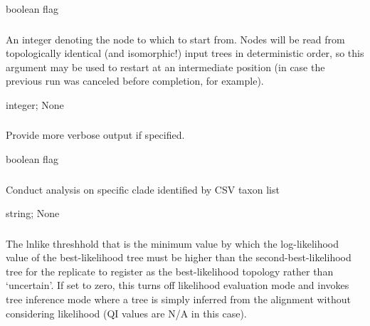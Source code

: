 \documentclass[letterpaper,12pt,english]{sphinxmanual}
\begin{document}
 boolean flag


\subsubsection{}
\label{\detokenize{prog_desc:s-start-node-number}}
 An integer denoting the node to which to start from. Nodes will be read from topologically identical (and isomorphic!) input trees in deterministic order, so this argument may be  used to restart at an intermediate position (in case the previous run was canceled before completion, for example).

 integer;  None


\subsubsection{}
\label{\detokenize{prog_desc:v-verbose}}
 Provide more verbose output if specified.

 boolean flag


\subsubsection{}
\label{\detokenize{prog_desc:c-clade}}
 Conduct analysis on specific clade identified by CSV taxon list

 string;  None


\subsubsection{}
\label{\detokenize{prog_desc:l-lnlike-thresh}}
 The lnlike threshhold that is the minimum value by which the log-likelihood value of the best-likelihood tree must be higher than the second-best-likelihood tree for the replicate to register as the best-likelihood topology rather than ‘uncertain’. If set to zero, this turns off likelihood evaluation mode and invokes tree inference mode where a tree is simply inferred from the alignment without considering likelihood (QI values are N/A in this case).
\end{document}
